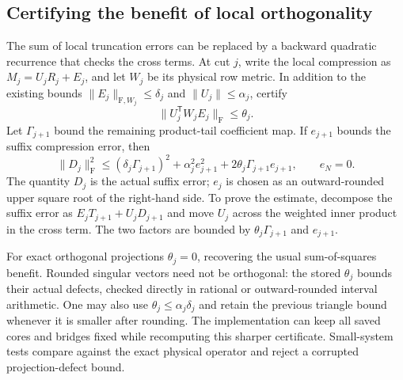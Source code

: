\documentclass[11pt]{article}
\begin{document}
\subsection{Certifying the benefit of local orthogonality}
The sum of local truncation errors can be replaced by a backward
quadratic recurrence that checks the cross terms. At cut $j$, write
the local compression as $M_j=U_jR_j+E_j$, and let $W_j$ be its physical
row metric. In addition to the existing bounds
$\|E_j\|_{\mathrm F,W_j}\le\delta_j$ and
$\|U_j\|\le\alpha_j$, certify
\[
 \|U_j^{\mathsf T}W_jE_j\|_{\mathrm F}\le\theta_j.
\]
Let $\Gamma_{j+1}$ bound the remaining product-tail coefficient map.
If $e_{j+1}$ bounds the suffix compression error, then
\[
 \|D_j\|_{\mathrm F}^2\le
 (\delta_j\Gamma_{j+1})^2+\alpha_j^2e_{j+1}^2
 +2\theta_j\Gamma_{j+1}e_{j+1},\qquad e_N=0.
\]
The quantity $D_j$ is the actual suffix error; $e_j$ is chosen as
an outward-rounded upper square root of the right-hand side. To prove the estimate, decompose
the suffix error as $E_jT_{j+1}+U_jD_{j+1}$ and move $U_j$ across the
weighted inner product in the cross term. The two factors are bounded
by $\theta_j\Gamma_{j+1}$ and $e_{j+1}$.

For exact orthogonal projections $\theta_j=0$, recovering the usual
sum-of-squares benefit. Rounded singular vectors need not be orthogonal:
the stored $\theta_j$ bounds their actual defects, checked directly in
rational or outward-rounded interval arithmetic. One may also use
$\theta_j\le\alpha_j\delta_j$ and retain the previous triangle bound
whenever it is smaller after rounding. The implementation can keep all
saved cores and bridges fixed while recomputing this sharper certificate.
Small-system tests compare against the exact physical operator and reject
a corrupted projection-defect bound.
\end{document}
